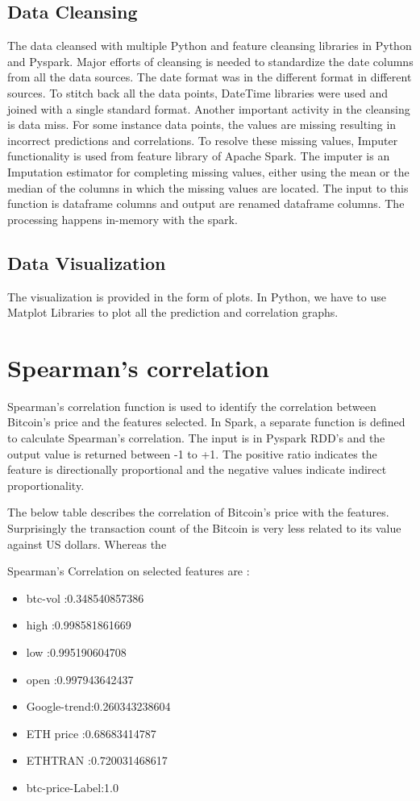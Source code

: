 \documentclass[sigconf]{acmart}
\begin{document}
\subsection{Data Cleansing}
The data cleansed with multiple Python and feature cleansing libraries in Python and Pyspark. Major efforts of cleansing is needed to standardize the date columns from all the data sources. The date format was in the different format in different sources. To stitch back all the data points, DateTime libraries were used and joined with a single standard format. Another important activity in the cleansing is data miss. For some instance data points, the values are missing resulting in incorrect predictions and correlations. To resolve these missing values, Imputer\cite{imputer:online} functionality is used from feature library of Apache Spark. The imputer is an Imputation estimator for completing missing values, either using the mean or the median of the columns in which the missing values are located. The input to this function is dataframe columns and output are renamed dataframe columns. The processing happens in-memory with the spark.

\subsection{Data Visualization}
The visualization is provided in the form of plots. In Python, we have to use Matplot Libraries to plot all the prediction and correlation graphs.


\section{Spearman's correlation}
Spearman's correlation function is used to identify the correlation between Bitcoin's price and the features selected. In Spark, a separate function is defined to calculate Spearman's correlation. The input is in Pyspark RDD's and the output value is returned between -1 to +1. The positive ratio indicates the feature is directionally proportional and the negative values indicate indirect proportionality.

The below table describes the correlation of Bitcoin's price with the features. Surprisingly the transaction count of the Bitcoin is very less related to its value against US dollars. Whereas the

Spearman's Correlation on selected features are :
\begin{itemize}
\item btc-vol     :0.348540857386 
\item high        :0.998581861669 
\item low         :0.995190604708 
\item open        :0.997943642437  
\item Google-trend:0.260343238604  
\item ETH price   :0.68683414787  
\item ETHTRAN     :0.720031468617
\item btc-price-Label:1.0 
\end{itemize}
\end{document}
